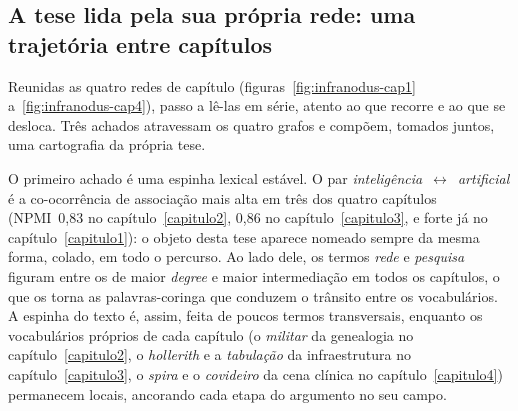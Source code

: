 %
%

\subsection*{A tese lida pela sua própria rede: uma trajetória entre capítulos}

Reunidas as quatro redes de capítulo (figuras~\ref{fig:infranodus-cap1}
a~\ref{fig:infranodus-cap4}), passo a lê-las em série, atento ao que
recorre e ao que se desloca. Três achados atravessam os quatro grafos e
compõem, tomados juntos, uma cartografia da própria tese.

O primeiro achado é uma espinha lexical estável. O par
\textit{inteligência}~$\leftrightarrow$~\textit{artificial} é a
co-ocorrência de associação mais alta em três dos quatro capítulos
(NPMI~0,83 no capítulo~\ref{capitulo2}, 0,86 no
capítulo~\ref{capitulo3}, e forte já no capítulo~\ref{capitulo1}): o
objeto desta tese aparece nomeado sempre da mesma forma, colado, em todo
o percurso. Ao lado dele, os termos \textit{rede} e \textit{pesquisa}
figuram entre os de maior \textit{degree} e maior intermediação em todos
os capítulos, o que os torna as palavras-coringa que conduzem o trânsito
entre os vocabulários. A espinha do texto é, assim, feita de poucos
termos transversais, enquanto os vocabulários próprios de cada capítulo
(o \textit{militar} da genealogia no capítulo~\ref{capitulo2}, o
\textit{hollerith} e a \textit{tabulação} da infraestrutura no
capítulo~\ref{capitulo3}, o \textit{spira} e o \textit{covideiro} da cena
clínica no capítulo~\ref{capitulo4}) permanecem locais, ancorando cada
etapa do argumento no seu campo.

